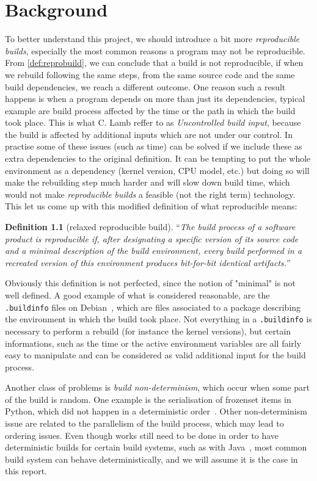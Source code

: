 \documentclass[a4paper,11pt,oneside]{report}
\theoremstyle{definition}
\newtheorem{definition}{Definition}[section]
\newcommand{\rb}{\emph{reproducible builds}\xspace}
\begin{document}
\chapter{Background}
\label{chap:bg}

To better understand this project, we should introduce a bit more \rb,
especially the most common reasons a program may not be reproducible. From
\autoref{def:reprobuild}, we can conclude that a build is not reproducible, if
when we rebuild following the same steps, from the same source code and the
same build dependencies, we reach a different outcome. One reason such a result
happens is when a program depends on more than just its dependencies, typical
example are build process affected by the time or the path in which the build
took place. This is what C. Lamb reffer to as \emph{Uncontrolled build input},
because the build is affected by additional inputs which are not under our
control.
In practise some of these issues (such as time) can be solved if we
include these as extra dependencies to the original definition. It can be tempting
to put the whole environment as a dependency (kernel version, CPU model, etc.) but
doing so will make the rebuilding step much harder and will slow down build time,
which would not make \rb a feasible (not the right term) technology.
This let us come up with this modified definition of what reproducible means:
\begin{definition}[relaxed reproducible build]
\label{def:reprobuild2}
``\emph{The build process of a software product is reproducible if, after
    designating a specific version of its source code and a minimal description
    of the build environment, every build performed in a recreated version of
    this environment produces bit-for-bit identical
    artifacts.}''
\end{definition}
Obviously this definition is not perfected, since the notion of "minimal" is
not well defined. A good example of what is considered reasonable, are the
\verb|.buildinfo| files on Debian~\cite{debian:buildinfo}, which are files
associated to a package describing the environment in which the build took
place. Not everything in a \verb|.buildinfo| is necessary to perform a rebuild
(for instance the kernel versions), but certain informations, such as the time
or the active environment variables are all fairly easy to manipulate and can
be considered as valid additional input for the build process.

Another class of problems is \emph{build non-determinism}, which occur when
some part of the build is random. One example is the serialisation of frozenset
items in Python, which did not happen in a deterministic
order~\cite{gh:pyc-frozenset}. Other non-determinism issue are related to the
parallelism of the build process, which may lead to ordering issues. Even
though works still need to be done in order to have deterministic builds for
certain build systems, such as with Java~\cite{xiong2022towards}, most common
build system can behave deterministically, and we will assume it is the case in
this report.
\end{document}
